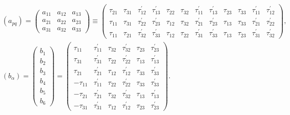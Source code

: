 \begin{align}
& \left(a_{p q}\right)=\left(\begin{array}{lll}
a_{11} & a_{12} & a_{13} \\
a_{21} & a_{22} & a_{23} \\
a_{31} & a_{32} & a_{33}
\end{array}\right) \equiv\left(\begin{array}{llllllllllll}
\tau_{21} & \tau_{31} & \tau_{12}^{\prime} & \tau_{13}^{\prime} & \tau_{22} & \tau_{32} & \tau_{11}^{\prime} & \tau_{13}^{\prime} & \tau_{23} & \tau_{33} & \tau_{11}^{\prime} & \tau_{12}^{\prime} \\
\tau_{11} & \tau_{31} & \tau_{22}^{\prime} & \tau_{23}^{\prime} & \tau_{12} & \tau_{32} & \tau_{21}^{\prime} & \tau_{23}^{\prime} & \tau_{13} & \tau_{33} & \tau_{21}^{\prime} & \tau_{22}^{\prime} \\
\tau_{11} & \tau_{21} & \tau_{32}^{\prime} & \tau_{33}^{\prime} & \tau_{12} & \tau_{22} & \tau_{31}^{\prime} & \tau_{33}^{\prime} & \tau_{13} & \tau_{23} & \tau_{31}^{\prime} & \tau_{32}^{\prime}
\end{array}\right),  \label{eq:10:6:2}\\
& \left(b_{\alpha}\right)=\left(\begin{array}{l}
b_{1} \\
b_{2} \\
b_{3} \\
b_{4} \\
b_{5} \\
b_{6}
\end{array}\right)=\left(\begin{array}{rrrrrr}
\tau_{11} & \tau_{11}^{\prime} & \tau_{32} & \tau_{32}^{\prime} & \tau_{23} & \tau_{23}^{\prime} \\
\tau_{31} & \tau_{31}^{\prime} & \tau_{22} & \tau_{22}^{\prime} & \tau_{13} & \tau_{13}^{\prime} \\
\tau_{21} & \tau_{21}^{\prime} & \tau_{12} & \tau_{12}^{\prime} & \tau_{33} & \tau_{33}^{\prime} \\
-\tau_{11} & \tau_{11}^{\prime} & \tau_{22} & \tau_{22}^{\prime} & \tau_{33} & \tau_{33}^{\prime} \\
-\tau_{21} & \tau_{21}^{\prime} & \tau_{32} & \tau_{32}^{\prime} & \tau_{13} & \tau_{13}^{\prime} \\
-\tau_{31} & \tau_{31}^{\prime} & \tau_{12} & \tau_{12}^{\prime} & \tau_{23} & \tau_{23}^{\prime}
\end{array}\right) . \label{eq:10:6:3}
\end{align}
